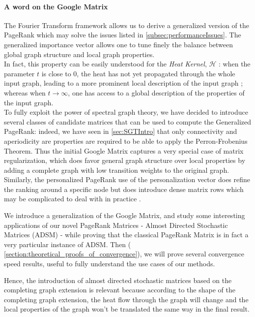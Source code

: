 \documentclass{article}
\begin{document}
\paragraph{A word on the Google Matrix}\label{subsec:main_consequences}
The Fourier Transform framework allows us to derive a generalized version of the PageRank which may solve the issues listed in \ref{subsec:performanceIssues}. The generalized importance vector allows one to tune finely the balance between global graph structure and local graph properties. \\
In fact, this property can be easily understood for the \textit{Heat Kernel}, $\mathcal{H}$ : when the parameter $t$ is close to 0, the heat has not yet propagated through the whole input graph, leading to a more prominent local description of the input graph ; whereas when $t \rightarrow \infty$, one has access to a global description of the properties of the input graph.\\

To fully exploit the power of spectral graph theory, we have decided to introduce several classes of candidate matrices that can be used to compute the Generalized PageRank: indeed, we have seen in \ref{sec:SGTIntro} that only connectivity and aperiodicity are properties are required to be able to apply the Perron-Frobenius Theorem. Thus the initial Google Matrix captures a very special case of matrix regularization, which does favor general graph structure over local properties by adding a complete graph with low transition weights to the original graph. Similarly, the personalized PageRank use of the personalization vector does refine the ranking around a specific node but does introduce dense matrix rows which may be complicated to deal with in practice \cite{langville_meyer_2004}.

We introduce a generalization of the Google Matrix, and study some interesting applications of our novel PageRank Matrices - Almost Directed Stochastic Matrices (ADSM) - while proving that the classical PageRank Matrix is in fact a very particular instance of ADSM. Then ( \ref{section:theoretical_proofs_of_convergence}), we will prove several convergence speed results, useful to fully understand the use cases of our methods. 



Hence, the introduction of almost directed stochastic matrices based on the completing graph extension is relevant because according to the shape of the completing graph extension, the heat flow through the graph will change and the local properties of the graph won't be translated the same way in the final result.
\end{document}
